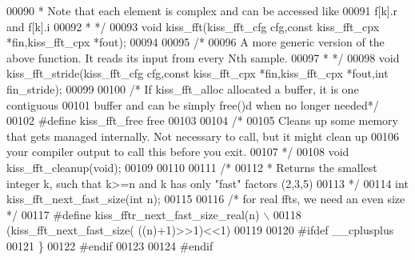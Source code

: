 \begin{DoxyCode}
00090 \textcolor{comment}{ * Note that each element is complex and can be accessed like}
00091 \textcolor{comment}{    f[k].r and f[k].i}
00092 \textcolor{comment}{ * */}
00093 \textcolor{keywordtype}{void} kiss_fft(kiss\_fft\_cfg cfg,\textcolor{keyword}{const} kiss_fft_cpx *fin,kiss_fft_cpx *fout);
00094 
00095 \textcolor{comment}{/*}
00096 \textcolor{comment}{ A more generic version of the above function. It reads its input from every Nth sample.}
00097 \textcolor{comment}{ * */}
00098 \textcolor{keywordtype}{void} kiss_fft_stride(kiss\_fft\_cfg cfg,\textcolor{keyword}{const} kiss_fft_cpx *fin,kiss_fft_cpx *fout,\textcolor{keywordtype}{int} fin\_stride);
00099 
00100 \textcolor{comment}{/* If kiss\_fft\_alloc allocated a buffer, it is one contiguous }
00101 \textcolor{comment}{   buffer and can be simply free()d when no longer needed*/}
00102 \textcolor{preprocessor}{#define kiss\_fft\_free free}
00103 
00104 \textcolor{comment}{/*}
00105 \textcolor{comment}{ Cleans up some memory that gets managed internally. Not necessary to call, but it might clean up }
00106 \textcolor{comment}{ your compiler output to call this before you exit.}
00107 \textcolor{comment}{*/}
00108 \textcolor{keywordtype}{void} kiss_fft_cleanup(\textcolor{keywordtype}{void});
00109     
00110 
00111 \textcolor{comment}{/*}
00112 \textcolor{comment}{ * Returns the smallest integer k, such that k>=n and k has only "fast" factors (2,3,5)}
00113 \textcolor{comment}{ */}
00114 \textcolor{keywordtype}{int} kiss_fft_next_fast_size(\textcolor{keywordtype}{int} n);
00115 
00116 \textcolor{comment}{/* for real ffts, we need an even size */}
00117 \textcolor{preprocessor}{#define kiss\_fftr\_next\_fast\_size\_real(n) \(\backslash\)}
00118 \textcolor{preprocessor}{        (kiss\_fft\_next\_fast\_size( ((n)+1)>>1)<<1)}
00119 
00120 \textcolor{preprocessor}{#ifdef \_\_cplusplus}
00121 \} 
00122 \textcolor{preprocessor}{#endif}
00123 
00124 \textcolor{preprocessor}{#endif}
\end{DoxyCode}
